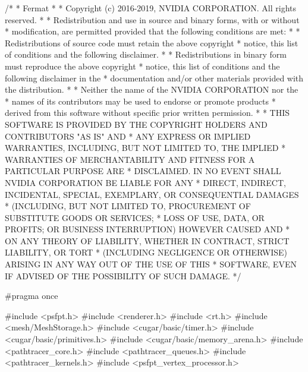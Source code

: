 
\begin{DoxyCodeInclude}
\textcolor{comment}{/*}
\textcolor{comment}{ * Fermat}
\textcolor{comment}{ *}
\textcolor{comment}{ * Copyright (c) 2016-2019, NVIDIA CORPORATION. All rights reserved.}
\textcolor{comment}{ * }
\textcolor{comment}{ * Redistribution and use in source and binary forms, with or without}
\textcolor{comment}{ * modification, are permitted provided that the following conditions are met:}
\textcolor{comment}{ *    * Redistributions of source code must retain the above copyright}
\textcolor{comment}{ *      notice, this list of conditions and the following disclaimer.}
\textcolor{comment}{ *    * Redistributions in binary form must reproduce the above copyright}
\textcolor{comment}{ *      notice, this list of conditions and the following disclaimer in the}
\textcolor{comment}{ *      documentation and/or other materials provided with the distribution.}
\textcolor{comment}{ *    * Neither the name of the NVIDIA CORPORATION nor the}
\textcolor{comment}{ *      names of its contributors may be used to endorse or promote products}
\textcolor{comment}{ *      derived from this software without specific prior written permission.}
\textcolor{comment}{ * }
\textcolor{comment}{ * THIS SOFTWARE IS PROVIDED BY THE COPYRIGHT HOLDERS AND CONTRIBUTORS "AS IS" AND}
\textcolor{comment}{ * ANY EXPRESS OR IMPLIED WARRANTIES, INCLUDING, BUT NOT LIMITED TO, THE IMPLIED}
\textcolor{comment}{ * WARRANTIES OF MERCHANTABILITY AND FITNESS FOR A PARTICULAR PURPOSE ARE}
\textcolor{comment}{ * DISCLAIMED. IN NO EVENT SHALL NVIDIA CORPORATION BE LIABLE FOR ANY}
\textcolor{comment}{ * DIRECT, INDIRECT, INCIDENTAL, SPECIAL, EXEMPLARY, OR CONSEQUENTIAL DAMAGES}
\textcolor{comment}{ * (INCLUDING, BUT NOT LIMITED TO, PROCUREMENT OF SUBSTITUTE GOODS OR SERVICES;}
\textcolor{comment}{ * LOSS OF USE, DATA, OR PROFITS; OR BUSINESS INTERRUPTION) HOWEVER CAUSED AND}
\textcolor{comment}{ * ON ANY THEORY OF LIABILITY, WHETHER IN CONTRACT, STRICT LIABILITY, OR TORT}
\textcolor{comment}{ * (INCLUDING NEGLIGENCE OR OTHERWISE) ARISING IN ANY WAY OUT OF THE USE OF THIS}
\textcolor{comment}{ * SOFTWARE, EVEN IF ADVISED OF THE POSSIBILITY OF SUCH DAMAGE.}
\textcolor{comment}{ */}

\textcolor{preprocessor}{#pragma once}

\textcolor{preprocessor}{#include <psfpt.h>}
\textcolor{preprocessor}{#include <renderer.h>}
\textcolor{preprocessor}{#include <rt.h>}
\textcolor{preprocessor}{#include <mesh/MeshStorage.h>}
\textcolor{preprocessor}{#include <cugar/basic/timer.h>}
\textcolor{preprocessor}{#include <cugar/basic/primitives.h>}
\textcolor{preprocessor}{#include <cugar/basic/memory\_arena.h>}
\textcolor{preprocessor}{#include <pathtracer\_core.h>}
\textcolor{preprocessor}{#include <pathtracer\_queues.h>}
\textcolor{preprocessor}{#include <pathtracer\_kernels.h>}
\textcolor{preprocessor}{#include <psfpt\_vertex\_processor.h>}



\end{DoxyCodeInclude}
